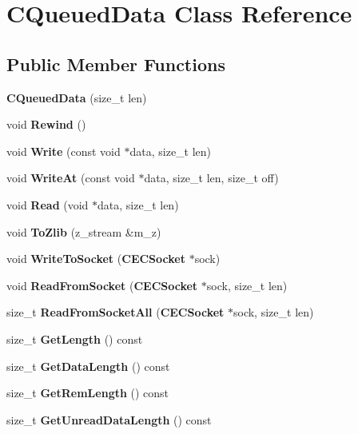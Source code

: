 \section{CQueuedData Class Reference}
\label{classCQueuedData}
\subsection*{Public Member Functions}
\begin{DoxyCompactItemize}
\item 
{\bfseries CQueuedData} (size\_\-t len)\label{classCQueuedData_aacf1b81da2a1557c939eeaaec53c6fbb}

\item 
void {\bfseries Rewind} ()\label{classCQueuedData_ab118bac1d1a5590ff132ad8ec292b6c0}

\item 
void {\bfseries Write} (const void $\ast$data, size\_\-t len)\label{classCQueuedData_afb17e0f6e31432e880afa10ddcd80661}

\item 
void {\bfseries WriteAt} (const void $\ast$data, size\_\-t len, size\_\-t off)\label{classCQueuedData_aeb12b1a931501268d14d1690d67bbcb5}

\item 
void {\bfseries Read} (void $\ast$data, size\_\-t len)\label{classCQueuedData_a83553698de396217b32f3664d8816d8e}

\item 
void {\bfseries ToZlib} (z\_\-stream \&m\_\-z)\label{classCQueuedData_aa8bbe563549686570dfb2ed4321400af}

\item 
void {\bfseries WriteToSocket} ({\bf CECSocket} $\ast$sock)\label{classCQueuedData_ad8a8c9b5b1fb0bf21b43743940119d49}

\item 
void {\bfseries ReadFromSocket} ({\bf CECSocket} $\ast$sock, size\_\-t len)\label{classCQueuedData_ac4809c64f7db0a03610c063af20b6e8a}

\item 
size\_\-t {\bfseries ReadFromSocketAll} ({\bf CECSocket} $\ast$sock, size\_\-t len)\label{classCQueuedData_a2d24ef468780cedf6c9a10e3eac0ed4d}

\item 
size\_\-t {\bfseries GetLength} () const \label{classCQueuedData_a8b4118c42087ed91e0648d649a22e868}

\item 
size\_\-t {\bfseries GetDataLength} () const \label{classCQueuedData_a3d912c6d9604f161934c5ede0e05f723}

\item 
size\_\-t {\bfseries GetRemLength} () const \label{classCQueuedData_a72ce623954f2cdc860fba1836758daa9}

\item 
size\_\-t {\bfseries GetUnreadDataLength} () const \label{classCQueuedData_ad61ee6699e7d1bd427cdbb22d6e161aa}

\end{DoxyCompactItemize}
